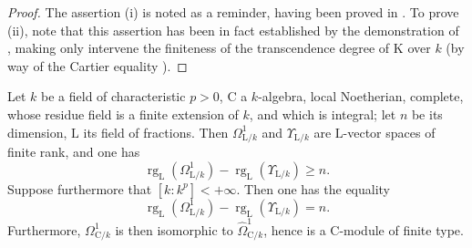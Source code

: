 \begin{proof}
The assertion (i) is noted as a reminder, having been proved in .
To prove (ii), note that this assertion has been in fact established by the demonstration of , making only intervene the finiteness of the transcendence degree of $\mathrm{K}$ over $k$ (by way of the Cartier equality ).
\end{proof}

\begin{lemma}[18.11.2]
\label{IV.18.11.2}
Let $k$ be a field of characteristic $p>0$, $\mathrm{C}$ a $k$-algebra, local Noetherian, complete, whose residue field is a finite extension of $k$, and which is integral; let $n$ be its dimension, $\mathrm{L}$ its field of fractions.
Then $\Omega^1_{\mathrm{L}/k}$ and $\Upsilon_{\mathrm{L}/k}$ are $\mathrm{L}$-vector spaces of finite rank, and one has
\begin{equation}
\label{IV.18.11.2.1}
\tag{18.11.2.1}
  \operatorname{rg}_{\mathrm{L}}(\Omega^1_{\mathrm{L}/k})-\operatorname{rg}_{\mathrm{L}}(\Upsilon_{\mathrm{L}/k})\geq n.
\end{equation}
Suppose furthermore that $[k:k^p]<+\infty$.
Then one has the equality
\begin{equation}
\label{IV.18.11.2.2}
\tag{18.11.2.2}
  \operatorname{rg}_{\mathrm{L}}(\Omega^1_{\mathrm{L}/k})-\operatorname{rg}_{\mathrm{L}}(\Upsilon_{\mathrm{L}/k})=n.
\end{equation}
Furthermore, $\Omega^1_{\mathrm{C}/k}$ is then isomorphic to $\hat{\Omega}^1_{\mathrm{C}/k}$, hence  is a $\mathrm{C}$-module of finite type.
\end{lemma}


